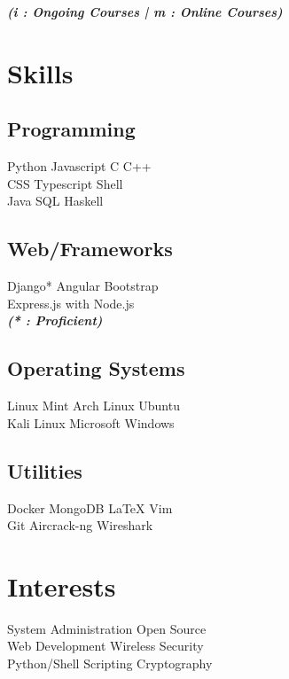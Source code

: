 \documentclass[]{deedy-resume-openfont}
\begin{document}
\begin{minipage}[t]{0.31\textwidth}
{\footnotesize \textit{\textbf{ (i : Ongoing Courses | m : Online Courses)}}}


\section{Skills}
\subsection{Programming}
Python \textbullet{} Javascript \textbullet{} C \textbullet{} C++ \\
CSS \textbullet{} Typescript \textbullet{} Shell \\
 \vspace{0.1 cm}
 Java \textbullet{} SQL \textbullet{} Haskell \\
\vspace{0.3 cm} 
\subsection{Web/Frameworks}
Django* \textbullet{} Angular \textbullet{} Bootstrap \\
Express.js with Node.js \\
{\footnotesize \textit{\textbf{ (* : Proficient)}}}
\vspace{0.3 cm}
\subsection{Operating Systems}
Linux Mint \textbullet{} Arch Linux \textbullet{} Ubuntu \\
Kali Linux \textbullet{} Microsoft Windows
\vspace{0.3 cm}
\subsection{Utilities}
Docker \textbullet{} MongoDB \textbullet{} \LaTeX{} \textbullet{} Vim \\
Git \textbullet{} Aircrack-ng \textbullet{} Wireshark \\


\section{Interests}
System Administration \textbullet{}Open Source \\
Web Development \textbullet{} Wireless Security \\
Python/Shell Scripting  \textbullet{} Cryptography\\
%
%

\end{minipage} 
\end{document}
